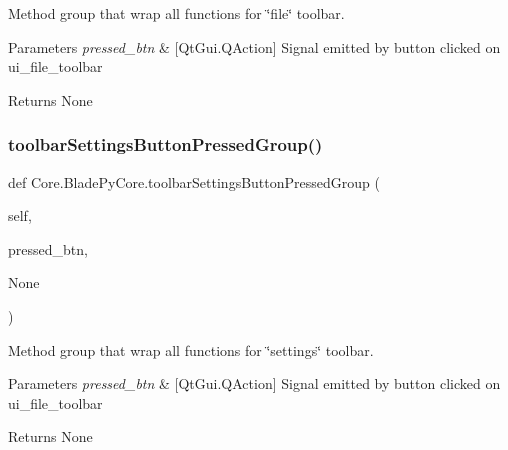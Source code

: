Method group that wrap all functions for \char`\"{}file\char`\"{} toolbar. 


\begin{DoxyParams}{Parameters}
{\em pressed\+\_\+btn} & \mbox{[}Qt\+Gui.\+Q\+Action\mbox{]} Signal emitted by button clicked on ui\+\_\+file\+\_\+toolbar \\
\hline
\end{DoxyParams}
\begin{DoxyReturn}{Returns}
None 
\end{DoxyReturn}
\hypertarget{a00078_abe6ec5c591c19b280f2e24bb198a1d6b}{}\label{a00078_abe6ec5c591c19b280f2e24bb198a1d6b} 
\subsubsection{\texorpdfstring{toolbar\+Settings\+Button\+Pressed\+Group()}{toolbarSettingsButtonPressedGroup()}}
{\footnotesize\ttfamily def Core.\+Blade\+Py\+Core.\+toolbar\+Settings\+Button\+Pressed\+Group (\begin{DoxyParamCaption}\item[{}]{self,  }\item[{}]{pressed\+\_\+btn,  }\item[{}]{None }\end{DoxyParamCaption})}



Method group that wrap all functions for \char`\"{}settings\char`\"{} toolbar. 


\begin{DoxyParams}{Parameters}
{\em pressed\+\_\+btn} & \mbox{[}Qt\+Gui.\+Q\+Action\mbox{]} Signal emitted by button clicked on ui\+\_\+file\+\_\+toolbar \\
\hline
\end{DoxyParams}
\begin{DoxyReturn}{Returns}
None 
\end{DoxyReturn}
\hypertarget{a00078_aabfc46144de45158b8d9c8952cfa1a7d}{}\label{a00078_aabfc46144de45158b8d9c8952cfa1a7d} 
